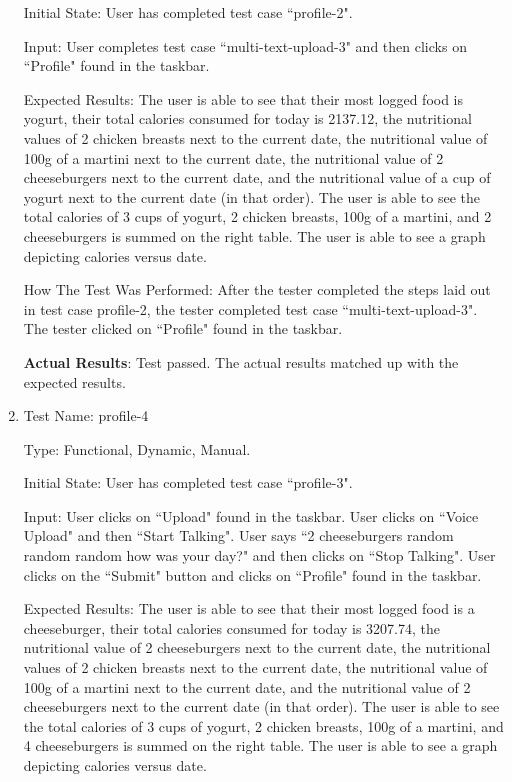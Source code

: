 \documentclass[12pt, titlepage]{article}
\begin{document}
\begin{enumerate}
		Initial State: User has completed test case ``profile-2".
		
		Input: User completes test case ``multi-text-upload-3" and then clicks on ``Profile" found in the taskbar.
		
		Expected Results: The user is able to see that their most logged food is yogurt, their total calories consumed for today is 2137.12, the nutritional values of 2 chicken breasts next to the current date, the nutritional value of 100g of a martini next to the current date, the nutritional value of 2 cheeseburgers next to the current date, and the nutritional value of a cup of yogurt next to the current date (in that order). The user is able to see the total calories of 3 cups of yogurt, 2 chicken breasts, 100g of a martini, and 2 cheeseburgers is summed on the right table. The user is able to see a graph depicting calories versus date.
		
		How The Test Was Performed: After the tester completed the steps laid out in test case profile-2, the tester completed test case ``multi-text-upload-3". The tester clicked on ``Profile" found in the taskbar.
		
		\textbf{Actual Results}: Test passed. The actual results matched up with the expected results.
		
		\item{Test Name: profile-4}
		
		Type: Functional, Dynamic, Manual.
		
		Initial State: User has completed test case ``profile-3".
		
		Input: User clicks on ``Upload" found in the taskbar. User clicks on ``Voice Upload" and then ``Start Talking". User says ``2 cheeseburgers random random random how was your day?" and then clicks on ``Stop Talking". User clicks on the ``Submit" button and clicks on ``Profile" found in the taskbar.
		
		Expected Results: The user is able to see that their most logged food is a cheeseburger, their total calories consumed for today is 3207.74, the nutritional value of 2 cheeseburgers next to the current date, the nutritional values of 2 chicken breasts next to the current date, the nutritional value of 100g of a martini next to the current date, and the nutritional value of 2 cheeseburgers next to the current date (in that order). The user is able to see the total calories of 3 cups of yogurt, 2 chicken breasts, 100g of a martini, and 4 cheeseburgers is summed on the right table. The user is able to see a graph depicting calories versus date.
		

\end{enumerate}
\end{document}
